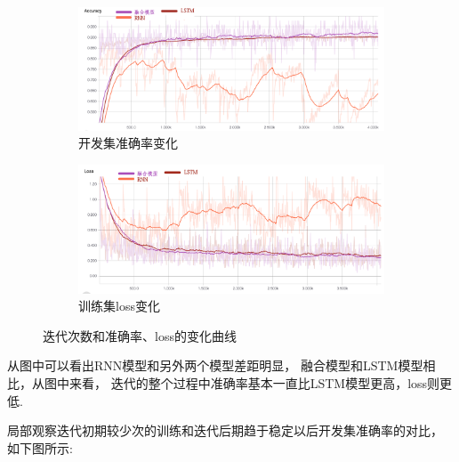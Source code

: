 \documentclass[bachelor,adobefonts]{jnuthesis}
\begin{document}
\begin{figure}[h!]
  \centering
  \begin{subfigure}[b]{0.8\linewidth}
    \includegraphics[width=\linewidth]{accuracy-1.png}
    \caption{开发集准确率变化}
  \end{subfigure}
  \begin{subfigure}[b]{0.8\linewidth}
    \includegraphics[width=\linewidth]{loss-1.png}
    \caption{训练集loss变化}
  \end{subfigure}
  \caption{迭代次数和准确率、loss的变化曲线}
\end{figure}

从图中可以看出RNN模型和另外两个模型差距明显，
融合模型和LSTM模型相比，从图中来看，
迭代的整个过程中准确率基本一直比LSTM模型更高，loss则更低.

局部观察迭代初期较少次的训练和迭代后期趋于稳定以后开发集准确率的对比，
如下图所示:
\end{document}
